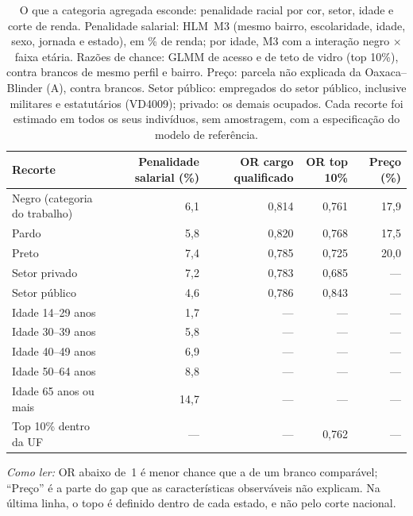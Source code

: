 \begin{table}[!ht]
\centering
\caption{O que a categoria agregada esconde: penalidade racial por cor, setor, idade e
corte de renda. Penalidade salarial: HLM~M3 (mesmo bairro, escolaridade, idade, sexo,
jornada e estado), em \% de renda; por idade, M3 com a interação negro $\times$ faixa
etária. Razões de chance: GLMM de acesso e de teto de vidro (top 10\%), contra brancos
de mesmo perfil e bairro. Preço: parcela não explicada da Oaxaca--Blinder (A), contra
brancos. Setor público: empregados do setor público, inclusive militares e estatutários
(VD4009); privado: os demais ocupados. Cada recorte foi estimado em todos os seus
indivíduos, sem amostragem, com a especificação do modelo de referência.}
\label{tab:heterogeneidade}
\begin{tabular}{lrrrr}
\toprule
Recorte & Penalidade salarial (\%) & OR cargo qualificado & OR top 10\% & Preço (\%) \\
\midrule
Negro (categoria do trabalho) & 6,1 & 0,814 & 0,761 & 17,9 \\
\quad Pardo & 5,8 & 0,820 & 0,768 & 17,5 \\
\quad Preto & 7,4 & 0,785 & 0,725 & 20,0 \\
Setor privado & 7,2 & 0,783 & 0,685 & --- \\
Setor público & 4,6 & 0,786 & 0,843 & --- \\
Idade 14--29 anos & 1,7 & --- & --- & --- \\
Idade 30--39 anos & 5,8 & --- & --- & --- \\
Idade 40--49 anos & 6,9 & --- & --- & --- \\
Idade 50--64 anos & 8,8 & --- & --- & --- \\
Idade 65 anos ou mais & 14,7 & --- & --- & --- \\
Top 10\% dentro da UF & --- & --- & 0,762 & --- \\
\bottomrule
\end{tabular}
\par\smallskip
\footnotesize\emph{Como ler:} OR abaixo de~1 é menor chance que a de um branco
comparável; ``Preço'' é a parte do gap que as características observáveis não explicam.
Na última linha, o topo é definido dentro de cada estado, e não pelo corte nacional.
\end{table}
